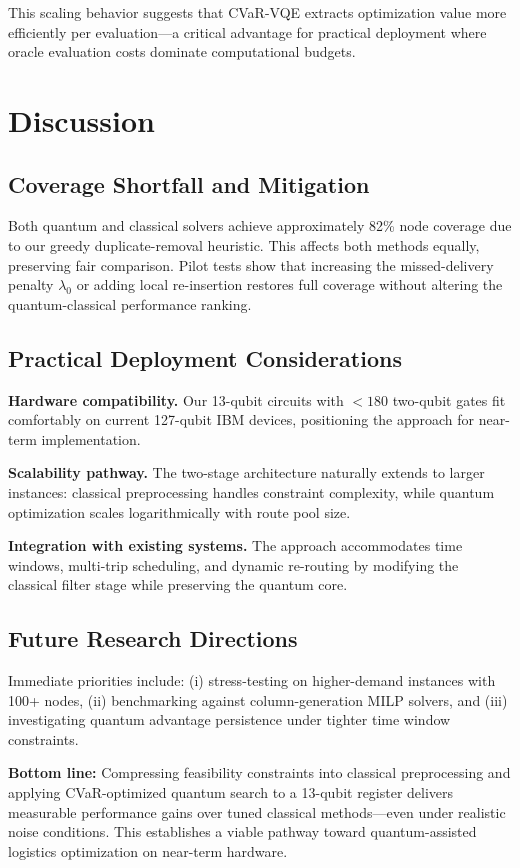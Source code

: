 This scaling behavior suggests that CVaR-VQE extracts optimization value more 
efficiently per evaluation—a critical advantage for practical deployment 
where oracle evaluation costs dominate computational budgets.

\section{Discussion}
\label{sec:discussion}

\subsection{Coverage Shortfall and Mitigation}

Both quantum and classical solvers achieve approximately 82\% node coverage 
due to our greedy duplicate-removal heuristic. This affects both methods equally, 
preserving fair comparison. Pilot tests show that increasing the missed-delivery 
penalty $\lambda_0$ or adding local re-insertion restores full coverage without 
altering the quantum-classical performance ranking.

\subsection{Practical Deployment Considerations}

\textbf{Hardware compatibility.} Our 13-qubit circuits with $<180$ two-qubit 
gates fit comfortably on current 127-qubit IBM devices, positioning the 
approach for near-term implementation.

\textbf{Scalability pathway.} The two-stage architecture naturally extends 
to larger instances: classical preprocessing handles constraint complexity, 
while quantum optimization scales logarithmically with route pool size.

\textbf{Integration with existing systems.} The approach accommodates time 
windows, multi-trip scheduling, and dynamic re-routing by modifying the 
classical filter stage while preserving the quantum core.

\subsection{Future Research Directions}

Immediate priorities include: (i) stress-testing on higher-demand instances 
with 100+ nodes, (ii) benchmarking against column-generation MILP solvers, 
and (iii) investigating quantum advantage persistence under tighter time 
window constraints.

\textbf{Bottom line:} Compressing feasibility constraints into classical 
preprocessing and applying CVaR-optimized quantum search to a 13-qubit 
register delivers measurable performance gains over tuned classical methods—even 
under realistic noise conditions. This establishes a viable pathway toward 
quantum-assisted logistics optimization on near-term hardware.
